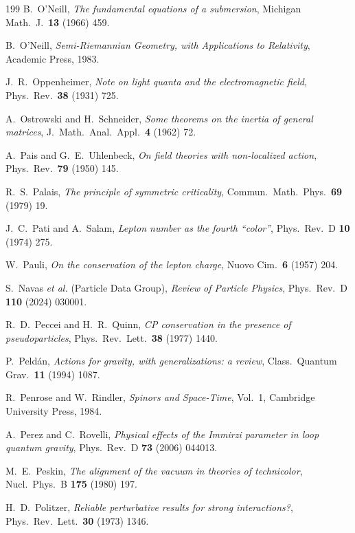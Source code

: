 \begin{thebibliography}{199}
 B.~O'Neill, \emph{The fundamental equations of a submersion}, Michigan Math.~J.~\textbf{13} (1966) 459.

 B.~O'Neill, \emph{Semi-Riemannian Geometry, with Applications to Relativity}, Academic Press, 1983.

 J.~R.~Oppenheimer, \emph{Note on light quanta and the electromagnetic field}, Phys.~Rev.~\textbf{38} (1931) 725.

 A.~Ostrowski and H.~Schneider, \emph{Some theorems on the inertia of general matrices}, J.~Math.~Anal.~Appl.~\textbf{4} (1962) 72.

 A.~Pais and G.~E.~Uhlenbeck, \emph{On field theories with non-localized action}, Phys.~Rev.~\textbf{79} (1950) 145.

 R.~S.~Palais, \emph{The principle of symmetric criticality}, Commun.~Math.~Phys.~\textbf{69} (1979) 19.

 J.~C.~Pati and A.~Salam, \emph{Lepton number as the fourth ``color''}, Phys.~Rev.~D \textbf{10} (1974) 275.

 W.~Pauli, \emph{On the conservation of the lepton charge}, Nuovo Cim.~\textbf{6} (1957) 204.

 S.~Navas \emph{et al.} (Particle Data Group), \emph{Review of Particle Physics}, Phys.~Rev.~D \textbf{110} (2024) 030001.

 R.~D.~Peccei and H.~R.~Quinn, \emph{CP conservation in the presence of pseudoparticles}, Phys.~Rev.~Lett.~\textbf{38} (1977) 1440.

 P.~Peld\'an, \emph{Actions for gravity, with generalizations: a review}, Class.~Quantum Grav.~\textbf{11} (1994) 1087.

 R.~Penrose and W.~Rindler, \emph{Spinors and Space-Time}, Vol.~1, Cambridge University Press, 1984.

 A.~Perez and C.~Rovelli, \emph{Physical effects of the Immirzi parameter in loop quantum gravity}, Phys.~Rev.~D \textbf{73} (2006) 044013.

 M.~E.~Peskin, \emph{The alignment of the vacuum in theories of technicolor}, Nucl.~Phys.~B \textbf{175} (1980) 197.

 H.~D.~Politzer, \emph{Reliable perturbative results for strong interactions?}, Phys.~Rev.~Lett.~\textbf{30} (1973) 1346.


\end{thebibliography}
